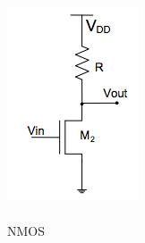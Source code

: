 \documentclass[pdftex,12pt,a4paper]{report}
\begin{document}
\begin{figure}[!htb]
  \includegraphics[width=\linewidth]{Imagens/NMOS.png}
  \caption{\\NMOS}\label{fig:fig_nmos}
\endminipage
{}

\end{figure}
\end{document}
